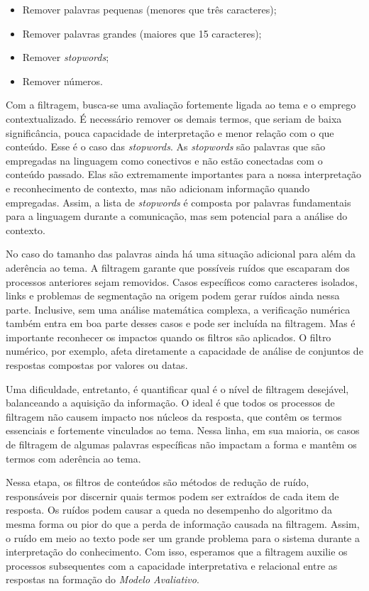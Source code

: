 \begin{itemize}
	\item Remover palavras pequenas (menores que três caracteres);
	\item Remover palavras grandes (maiores que 15 caracteres);
	\item Remover \textit{stopwords};
	\item Remover números.
\end{itemize}

Com a filtragem, busca-se uma avaliação fortemente ligada ao tema e o emprego contextualizado. É necessário remover os demais termos, que seriam de baixa significância, pouca capacidade de interpretação e menor relação com o que conteúdo. Esse é o caso das \textit{stopwords}. As \textit{stopwords} são palavras que são empregadas na linguagem como conectivos e não estão conectadas com o conteúdo passado. Elas são extremamente importantes para a nossa interpretação e reconhecimento de contexto, mas não adicionam informação quando empregadas. Assim, a lista de \textit{stopwords} é composta por palavras fundamentais para a linguagem durante a comunicação, mas sem potencial para a análise do contexto.

No caso do tamanho das palavras ainda há uma situação adicional para além da aderência ao tema. A filtragem garante que possíveis ruídos que escaparam dos processos anteriores sejam removidos. Casos específicos como caracteres isolados, links e problemas de segmentação na origem podem gerar ruídos ainda nessa parte. Inclusive, sem uma análise matemática complexa, a verificação numérica também entra em boa parte desses casos e pode ser incluída na filtragem. Mas é importante reconhecer os impactos quando os filtros são aplicados. O filtro numérico, por exemplo, afeta diretamente a capacidade de análise de conjuntos de respostas compostas por valores ou datas. 

Uma dificuldade, entretanto, é quantificar qual é o nível de filtragem desejável, balanceando a aquisição da informação. O ideal é que todos os processos de filtragem não causem impacto nos núcleos da resposta, que contêm os termos essenciais e fortemente vinculados ao tema. Nessa linha, em sua maioria, os casos de filtragem de algumas palavras específicas não impactam a forma e mantêm os termos com aderência ao tema.

Nessa etapa, os filtros de conteúdos são métodos de redução de ruído, responsáveis por discernir quais termos podem ser extraídos de cada item de resposta. Os ruídos podem causar a queda no desempenho do algoritmo da mesma forma ou pior do que a perda de informação causada na filtragem. Assim, o ruído em meio ao texto pode ser um grande problema para o sistema durante a interpretação do conhecimento. Com isso, esperamos que a filtragem auxilie os processos subsequentes com a capacidade interpretativa e relacional entre as respostas na formação do \textit{Modelo Avaliativo}.


